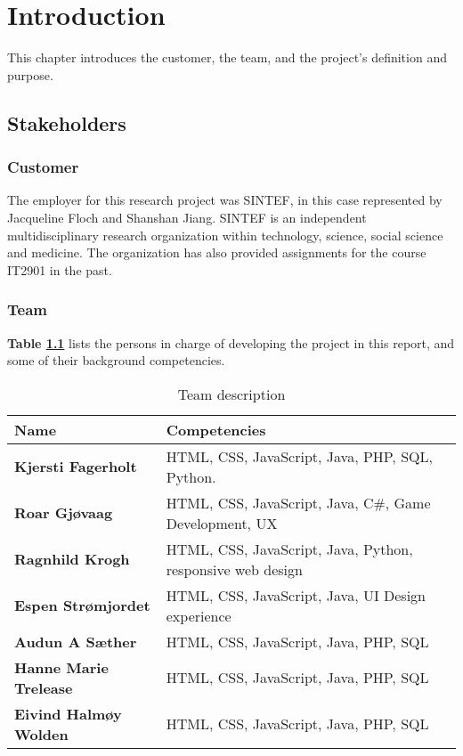 
\chapter{Introduction}

This chapter introduces the customer, the team, and the project's definition and purpose.

\section{Stakeholders}

\subsection{Customer}

The employer for this research project was SINTEF, in this case represented by Jacqueline Floch and Shanshan Jiang. SINTEF is an independent multidisciplinary research organization within technology, science, social science and medicine. The organization has also provided assignments for the course IT2901 in the past.

\subsection{Team}

\textbf{Table \ref{Tab:team}} lists the persons in charge of developing the project in this report, and some of their background competencies.

\begin{table}[!h]
	\begin{center}
		\caption{Team description}
		\label{Tab:team}
		\begin{tabular}{  l  l }
			\textbf{Name} & \textbf{Competencies} \\ \hline
			\textbf{Kjersti Fagerholt} & HTML, CSS, JavaScript, Java, PHP, SQL, Python. \\ 
			\textbf{Roar Gjøvaag} &  HTML, CSS, JavaScript, Java, C\#, Game Development, UX \\ 
			\textbf{Ragnhild Krogh} & HTML, CSS, JavaScript, Java, Python, responsive web design \\ 
			\textbf{Espen Strømjordet} & HTML, CSS, JavaScript, Java,
			UI Design experience \\ 
			\textbf{Audun A Sæther} & HTML, CSS, JavaScript, Java, PHP, SQL \\ 
			\textbf{Hanne Marie Trelease} & HTML, CSS, JavaScript, Java, PHP, SQL \\ 
			\textbf{Eivind Halmøy Wolden} & HTML, CSS, JavaScript, Java, PHP, SQL \\ 
		\end{tabular}
	\end{center}
\end{table}

